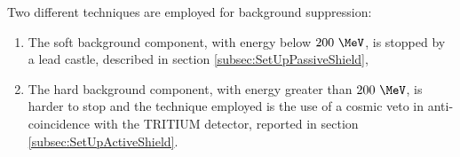 Two different techniques are employed for background suppression:

\begin{enumerate}

\item{}  The soft background component, with energy below $200~\MeV$, is stopped by a lead castle, described in section \ref{subsec:SetUpPassiveShield},

\item{} The hard background component, with energy greater than $200~\MeV$, is harder to stop and the technique employed is the use of a cosmic veto in anti-coincidence with the TRITIUM detector, reported in section \ref{subsec:SetUpActiveShield}. %

\end{enumerate}